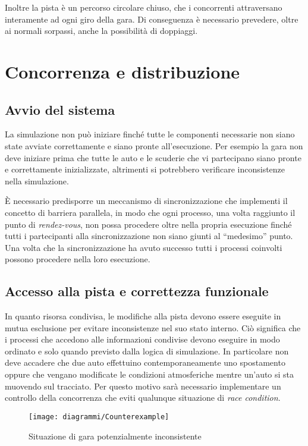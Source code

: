 Inoltre la pista è un percorso circolare chiuso, che i concorrenti attraversano interamente ad ogni giro della gara. Di conseguenza è necessario prevedere, oltre ai normali sorpassi, anche la possibilità di doppiaggi.

\section{Concorrenza e distribuzione}
\subsection*{Avvio del sistema}
La simulazione non può iniziare finché tutte le componenti necessarie non siano state avviate correttamente e siano pronte all'esecuzione. Per esempio la gara non deve iniziare prima che tutte le auto e le scuderie che vi partecipano siano pronte e correttamente inizializzate, altrimenti si potrebbero verificare inconsistenze nella simulazione.

\`E necessario predisporre un meccanismo di sincronizzazione che implementi il concetto di barriera parallela, in modo che ogni processo, una volta raggiunto il punto di \textsl{rendez-vous}, non possa procedere oltre nella propria esecuzione finché tutti i partecipanti alla sincronizzazione non siano giunti al ``medesimo'' punto. Una volta che la sincronizzazione ha avuto successo tutti i processi coinvolti possono procedere nella loro esecuzione.

\subsection*{Accesso alla pista e correttezza funzionale}
\label{sec:motivazioneSched}
In quanto risorsa condivisa, le modifiche alla pista devono essere eseguite in mutua esclusione per evitare inconsistenze nel suo stato interno. Ciò significa che i processi che accedono alle informazioni condivise devono eseguire in modo ordinato e solo quando previsto dalla logica di simulazione. In particolare non deve accadere che due auto effettuino contemporaneamente uno spostamento oppure che vengano modificate le condizioni atmosferiche mentre un'auto si sta muovendo sul tracciato. Per questo motivo sarà necessario implementare un controllo della concorrenza che eviti qualunque situazione di \textit{race condition}.

\begin{figure}
\begin{center}
\texttt{[image: diagrammi/Counterexample]}
\caption{Situazione di gara potenzialmente inconsistente}
\label{fig:counterexample}
\end{center}
\end{figure}

